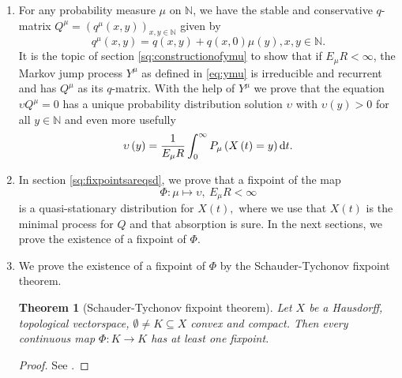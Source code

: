 \documentclass[12pt,a4paper]{scrartcl}
\newtheorem{theorem}{Theorem}[section]
\numberwithin{equation}{section}
\newcommand{\N}{\mathbb{N}} %
\begin{document}
\begin{enumerate}
\item For any probability measure $\mu$ on $\N$, we have the stable and conservative $q$-matrix $Q^{\mu}=\left(q^{\mu}\left(x,y\right)\right)_{x,y \in \N}$ given by
\begin{equation} \label{eq:qmu}
q^{\mu}\left(x,y\right) = q\left(x,y\right) + q\left(x,0\right) \mu\left(y\right) , x,y \in \N.
\end{equation}
It is the topic of section \ref{sq:constructionofymu} to show that if $E_{\mu} R < \infty$, the Markov jump process $Y^{\mu}$ as defined in \eqref{eq:ymu} is irreducible and recurrent and has $Q^{\mu}$ as its $q$-matrix. With the help of $Y^{\mu}$ we prove that the equation $ \upsilon Q^{\mu} = 0 $ has a unique probability distribution solution $\upsilon$ with $\upsilon\left(y\right) > 0$ for all $y \in \N$ and even more usefully
\begin{equation} \label{eq:linktoxt}
\upsilon\left(y\right) = \frac{1}{E_{\mu} R} \int_0^{\infty} P_{\mu} \left(X\left(t\right) = y  \right) \textnormal{d}t.
\end{equation}

\item In section \ref{sq:fixpointsareqsd}, we prove that a fixpoint of the map
\begin{equation}
\Phi: \mu \mapsto \upsilon, \ E_{\mu} R < \infty
\end{equation}
is a quasi-stationary distribution for $X\left(t\right),$ where we use that $X\left(t\right)$ is the minimal process for $Q$ and that absorption is sure. In the next sections, we prove the existence of a fixpoint of $\Phi.$
\item We prove the existence of a fixpoint of $\Phi$ by the Schauder-Tychonov fixpoint theorem.
\begin{theorem} [Schauder-Tychonov fixpoint theorem]
Let $X$ be a Hausdorff, topological vectorspace,  $\emptyset \neq K \subseteq X$ convex and  compact. Then every continuous map $ \Phi: K \to K $ has at least one fixpoint.
\end{theorem}
\begin{proof}
See \cite{cauty}.
\end{proof} 


\end{enumerate}
\end{document}
